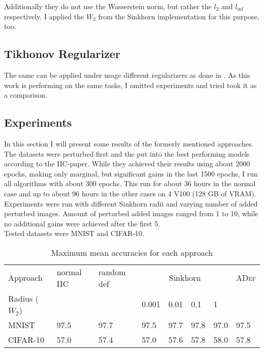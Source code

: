 \documentclass[]{article}
\begin{document}
Additionally they do not use the Wasserstein norm, but rather the $l_2$ and $l_{\inf}$ respectively. I applied the $W_2$ from the Sinkhorn implementation for this purpose, too. 

\subsection{Tikhonov Regularizer}

The same can be applied under usage different regularizers as done in \cite{Tikhonov}. As this work is performing on the same tasks, I omitted experiments and tried took it as a comparison. 

\subsection{Experiments}

In this section I will present some results of the formerly mentioned approaches. The datasets were perturbed first and the put into the best performing models according to the IIC-paper. While they achieved their results using about 2000 epochs, making only marginal, but significant gains in the last 1500 epochs, I run all algorithms with about 300 epochs. This run for about 36 hours in the normal case and up to about 96 hours in the other cases on 4 V100 (128 GB of VRAM). Experiments were run with different Sinkhorn radii and varying number of added perturbed images. Amount of perturbed added images ranged from 1 to 10, while no additional gains were achieved after the first 5. \\

Tested datasets were MNIST and CIFAR-10.

\begin{table}[h!]
	\begin{center}

		\label{tab:table1}
		\begin{tabular}{|l|l|l|l|l|l|l|l|}
			\hline
			Approach & normal IIC & random def& \multicolumn{4}{c|}{Sinkhorn}&\textsc{ADef}\\
			Radius ($W_2$)&&&0.001&0.01&0.1&1&\\
			\hline
			MNIST & 97.5 &97.7& 97.5 & 97.7 & 97.8 & 97.0&97.5\\
			CIFAR-10&57.0&57.4&57.0&57.6&57.8 & 58.0 & 57.8\\
			\hline
			
		\end{tabular}
		\caption{Maximum mean accuracies for each approach}

	\end{center}
\end{table}
\end{document}
